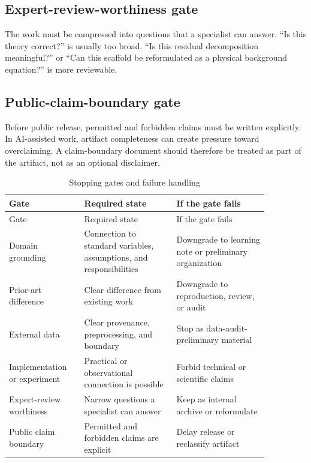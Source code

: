 \documentclass[a4paper,11pt]{article}
\begin{document}
\subsection{Expert-review-worthiness gate}

The work must be compressed into questions that a specialist can answer. ``Is this theory correct?'' is usually too broad. ``Is this residual decomposition meaningful?'' or ``Can this scaffold be reformulated as a physical background equation?'' is more reviewable.

\subsection{Public-claim-boundary gate}

Before public release, permitted and forbidden claims must be written explicitly. In AI-assisted work, artifact completeness can create pressure toward overclaiming. A claim-boundary document should therefore be treated as part of the artifact, not as an optional disclaimer.

\begin{longtable}{p{0.24\linewidth}p{0.31\linewidth}p{0.31\linewidth}}
\caption{Stopping gates and failure handling}\label{tab:gates}\\
\toprule
Gate & Required state & If the gate fails\\
\midrule
\endfirsthead
\toprule
Gate & Required state & If the gate fails\\
\midrule
\endhead
Domain grounding & Connection to standard variables, assumptions, and responsibilities & Downgrade to learning note or preliminary organization\\
Prior-art difference & Clear difference from existing work & Downgrade to reproduction, review, or audit\\
External data & Clear provenance, preprocessing, and boundary & Stop as data-audit-preliminary material\\
Implementation or experiment & Practical or observational connection is possible & Forbid technical or scientific claims\\
Expert-review worthiness & Narrow questions a specialist can answer & Keep as internal archive or reformulate\\
Public claim boundary & Permitted and forbidden claims are explicit & Delay release or reclassify artifact\\
\bottomrule
\end{longtable}
\end{document}

